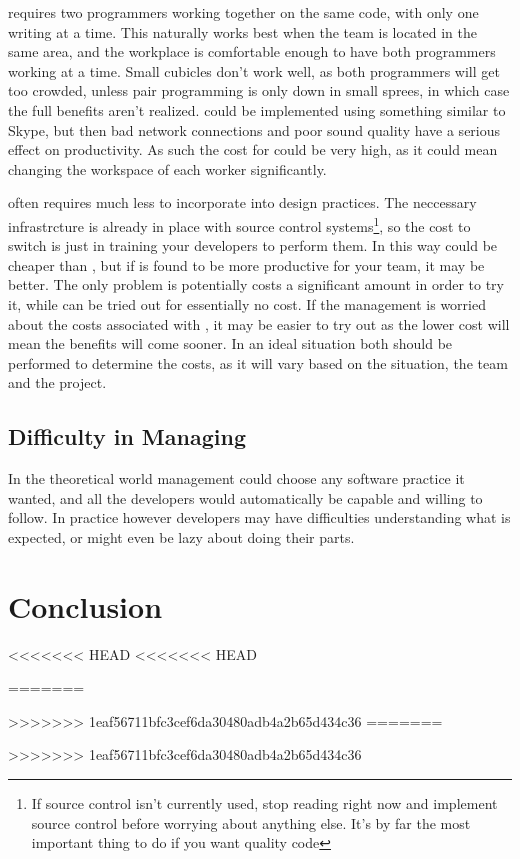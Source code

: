 \documentclass{article}
\begin{document}
\PP requires two programmers working together on the same code, with only one writing at a time. This naturally works best when the team is located in the same area, and the workplace is comfortable enough to have both programmers working at a time. Small cubicles don't work well, as both programmers will get too crowded, unless pair programming is only down in small sprees, in which case the full benefits aren't realized. \PP could be implemented using something similar to Skype, but then bad network connections and poor sound quality have a serious effect on productivity. As such the cost for \PP could be very high, as it could mean changing the workspace of each worker significantly.

\CR often requires much less to incorporate into design practices. The neccessary infrastrcture is already in place with source control systems\footnote{If source control isn't currently used, stop reading right now and implement source control before worrying about anything else. It's by far the most important thing to do if you want quality code}, so the cost to switch is just in training your developers to perform them. In this way \CR could be cheaper than \PP, but if \PP is found to be more productive for your team, it may be better. The only problem is \PP potentially costs a significant amount in order to try it, while \CR can be tried out for essentially no cost. If the management is worried about the costs associated with \PP, it may be easier to try out \CR as the lower cost will mean the benefits will come sooner. In an ideal situation both should be performed to determine the costs, as it will vary based on the situation, the team and the project.


\subsection{Difficulty in Managing}

In the theoretical world management could choose any software practice it wanted, and all the developers would automatically be capable and willing to follow. In practice however developers may have difficulties understanding what is expected, or might even be lazy about doing their parts.

\section{Conclusion}


<<<<<<< HEAD
<<<<<<< HEAD


=======


>>>>>>> 1eaf56711bfc3cef6da30480adb4a2b65d434c36
=======


>>>>>>> 1eaf56711bfc3cef6da30480adb4a2b65d434c36
\end{document}
